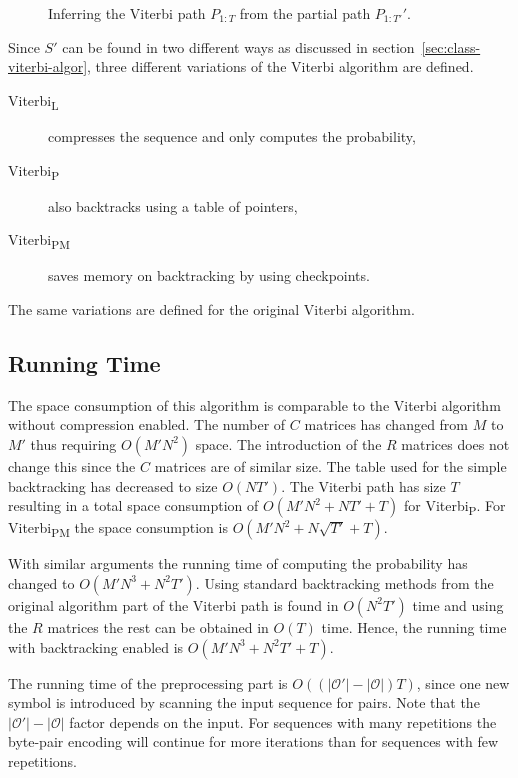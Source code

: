 \begin{figure}
  \centering
  
  \caption{Inferring the Viterbi path $P_{1:T}$ from the partial path
    $P_{1:T'}'$. }
  \label{fig:infering-viterbi-path}
\end{figure}

Since $S'$ can be found in two different ways as discussed in
section~\ref{sec:class-viterbi-algor}, three different variations of the Viterbi
algorithm are defined.
\begin{description}
\item[Viterbi\textsubscript{L}] compresses the sequence and only computes the
  probability,
\item[Viterbi\textsubscript{P}] also backtracks using a table of pointers,
\item[Viterbi\textsubscript{PM}] saves memory on backtracking by using checkpoints.
\end{description}
The same variations are defined for the original Viterbi algorithm.

\subsection{Running Time}
\label{sec:running-time}

The space consumption of this algorithm is comparable to the Viterbi algorithm
without compression enabled. The number of $C$ matrices has changed from $M$ to
$M'$ thus requiring $O(M' N^2)$ space. The introduction of the $R$ matrices
does not change this since the $C$ matrices are of similar size. The table used
for the simple backtracking has decreased to size $O(N T')$. The Viterbi path
has size $T$ resulting in a total space consumption of $O(M' N^2 + N T' + T)$
for Viterbi\textsubscript{P}. For Viterbi\textsubscript{PM} the space
consumption is $O(M' N^2 + N \sqrt{T'} + T)$.

With similar arguments the running time of computing the probability has changed
to $O(M' N^3 +N^2 T')$. Using standard backtracking methods from the original
algorithm part of the Viterbi path is found in $O(N^2 T')$ time and using the
$R$ matrices the rest can be obtained in $O(T)$ time. Hence, the
running time with backtracking enabled is $O(M' N^3 +N^2 T' + T)$.

The running time of the preprocessing part is $O(
(
  \lvert\mathcal{O'}\rvert - \lvert{\mathcal{O}}\rvert
) T)$, since one new symbol is introduced by scanning the input sequence for
pairs. Note that the $\lvert\mathcal{O'}\rvert - \lvert{\mathcal{O}}\rvert$
factor depends on the input. For sequences with many repetitions the byte-pair
encoding will continue for more iterations than for sequences with few
repetitions.

